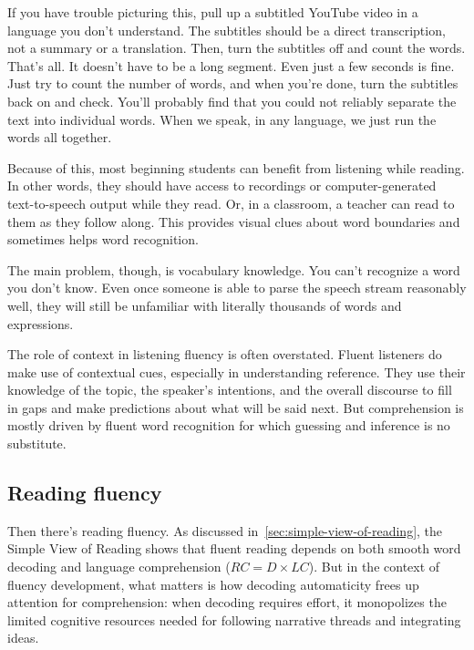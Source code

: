 If you have trouble picturing this, pull up a subtitled YouTube video in a language you don't understand. The subtitles should be a direct transcription, not a summary or a translation. Then, turn the subtitles off and count the words. That's all. It doesn't have to be a long segment. Even just a few seconds is fine. Just try to count the number of words, and when you're done, turn the subtitles back on and check. You'll probably find that you could not reliably separate the text into individual words. When we speak, in any language, we just run the words all together.

Because of this, most beginning students can benefit from listening while reading. In other words, they should have access to recordings or computer-generated text-to-speech output while they read. Or, in a classroom, a teacher can read to them as they follow along. This provides visual clues about word boundaries and sometimes helps word recognition.

The main problem, though, is vocabulary knowledge. You can't recognize a word you don't know. Even once someone is able to parse the speech stream reasonably well, they will still be unfamiliar with literally thousands of words and expressions. 

The role of context in listening fluency is often overstated. Fluent listeners do make use of contextual cues, especially in understanding reference. They use their knowledge of the topic, the speaker's intentions, and the overall discourse to fill in gaps and make predictions about what will be said next. But comprehension is mostly driven by fluent word recognition for which guessing and inference is no substitute.

\subsection{Reading fluency}\label{sec:reading-fluency}

Then there's reading fluency. As discussed in~\ref{sec:simple-view-of-reading}, the Simple View of Reading \citep{Gough1986} shows that fluent reading depends on both smooth word decoding and language comprehension ($RC=D\times LC$). But in the context of fluency development, what matters is how decoding automaticity frees up attention for comprehension: when decoding requires effort, it monopolizes the limited cognitive resources needed for following narrative threads and integrating ideas.

